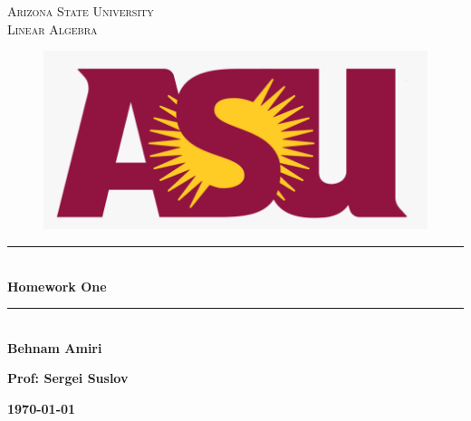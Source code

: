 \documentclass[fleqn]{article}
\begin{document}
  \begin{titlepage}

    \newcommand{\HRule}{\rule{\linewidth}{0.5mm}}

    \center


    \textsc{\LARGE Arizona State University}\\[1.5cm]

    \textsc{\LARGE Linear Algebra }\\[1.5cm]


    \begin{figure}
      \includegraphics[width=\linewidth]{asu.png}
    \end{figure}


    \HRule \\[0.4cm]
    { \huge \bfseries Homework One}\\[0.4cm] 
    \HRule \\[1.5cm]

    \textbf{Behnam Amiri}

    \bigbreak

    \textbf{Prof: Sergei Suslov}

    \bigbreak


    \textbf{{\large \today}\\[2cm]}

    \vfill

  \end{titlepage}
\end{document}
